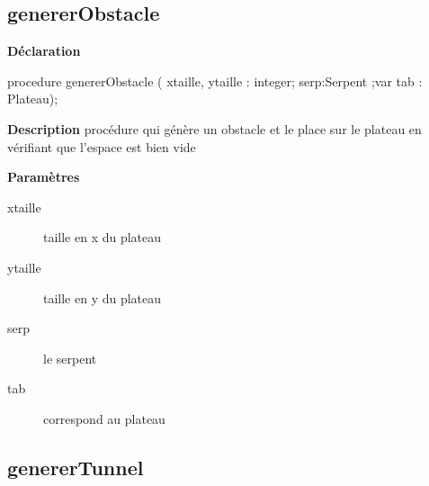 \documentclass{report}
\newif\ifpdf
\begin{document}
\subsection*{genererObstacle}
\fi
\label{Generation-genererObstacle}
\begin{list}{}{
\setlength{\itemindent}{0cm}
\setlength{\listparindent}{0cm}
\setlength{\leftmargin}{\evensidemargin}
\addtolength{\leftmargin}{\tmplength}
\settowidth{\labelsep}{X}
\addtolength{\leftmargin}{\labelsep}
\setlength{\labelwidth}{\tmplength}
}
\item[\textbf{Déclaration}\hfill]
\ifpdf
\begin{flushleft}
\fi
\begin{ttfamily}
procedure genererObstacle ( xtaille, ytaille : integer; serp:Serpent ;var tab : Plateau);\end{ttfamily}

\ifpdf
\end{flushleft}
\fi

\par
\item[\textbf{Description}]
procédure qui génère un obstacle et le place sur le plateau en vérifiant que l'espace est bien vide    \par
\item[\textbf{Paramètres}]
\begin{description}
\item[xtaille] taille en x du plateau
\item[ytaille] taille en y du plateau
\item[serp] le serpent
\item[tab] correspond au plateau
\end{description}


\end{list}
\ifpdf
\subsection*{\large{\textbf{genererTunnel}}\normalsize\hspace{1ex}\hrulefill}
\else
\end{document}
